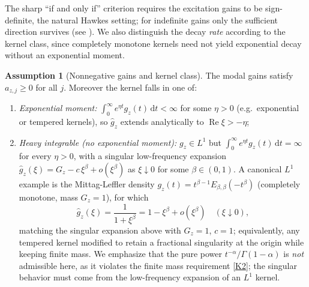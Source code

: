 \documentclass[11pt]{article}
\theoremstyle{plain}
\theoremstyle{definition}
\newtheorem{assumption}{Assumption}
\theoremstyle{remark}
\newcommand{\re}{\operatorname{Re}}
\newcommand{\dd}{\mathrm{d}}
\newcommand{\Laplace}{\widehat}
\begin{document}
The sharp ``if and only if'' criterion requires the excitation gains to be sign-definite, the
natural Hawkes setting; for indefinite gains only the sufficient direction survives (see
). We also distinguish the decay \emph{rate} according to the kernel class, since
completely monotone kernels need not yield exponential decay without an exponential moment.

\begin{assumption}[Nonnegative gains and kernel class]
\label{ass:gains}
The modal gains satisfy $a_{z,j}\ge0$ for all $j$. Moreover the kernel falls in one of:
\begin{enumerate}[label=\textup{(C\arabic*)},leftmargin=2.6em]
\item\label{C1} \emph{Exponential moment:} $\int_0^\infty e^{\eta t}g_z(t)\,\dd t<\infty$ for some
$\eta>0$ (e.g.\ exponential or tempered kernels), so $\Laplace g_z$ extends analytically to
$\re\xi>-\eta$;
\item\label{C2} \emph{Heavy integrable (no exponential moment):} $g_z\in L^1$ but $\int_0^\infty
e^{\eta t}g_z(t)\,\dd t=\infty$ for every $\eta>0$, with a singular low-frequency expansion
$\Laplace g_z(\xi)=G_z-c\,\xi^{\beta}+o(\xi^{\beta})$ as $\xi\downarrow0$ for some
$\beta\in(0,1)$. A canonical $L^1$ example is the Mittag-Leffler density
$g_z(t)=t^{\beta-1}E_{\beta,\beta}(-t^\beta)$ (completely monotone, mass $G_z=1$), for which
\[
\Laplace g_z(\xi)=\frac{1}{1+\xi^\beta}=1-\xi^\beta+o(\xi^\beta)\quad(\xi\downarrow0),
\]
matching the singular expansion above with $G_z=1$, $c=1$; equivalently, any tempered kernel
modified to retain a fractional singularity at the origin while keeping finite mass. We emphasize
that the pure power $t^{-\alpha}/\Gamma(1-\alpha)$ is \emph{not} admissible here, as it violates
the finite mass requirement \ref{K2}; the singular behavior must come from the low-frequency
expansion of an $L^1$ kernel.
\end{enumerate}
\end{assumption}
\end{document}
